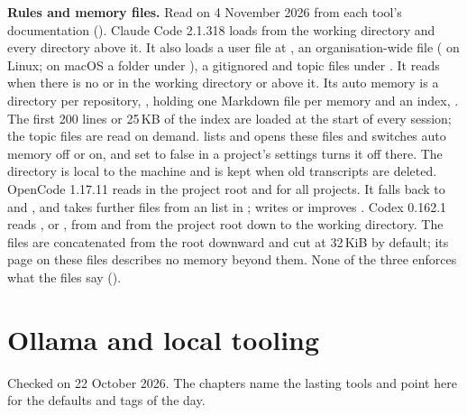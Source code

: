 \begin{sloppypar}
\textbf{Rules and memory files.} Read on 4 November 2026 from each tool's
documentation (). Claude Code 2.1.318 loads 
from the working directory and every directory above it. It also loads a user
file at , an organisation-wide file
( on Linux; on macOS a 
folder under  ), a gitignored
 and topic files under . It reads
 when there is no  or 
in the working directory or above it. Its auto memory is a directory per
repository, \allowbreak{}, holding
one Markdown file per memory and an index, . The first 200
lines or 25\,KB of the index are loaded at the start of every session; the
topic files are read on demand.  lists and opens these files and
switches auto memory off or on, and  set to false in a
project's settings turns it off there. The directory is local to the machine
and is kept when old transcripts are deleted. OpenCode 1.17.11 reads
 in the project root and
 for all projects. It falls
back to  and , and
takes further files from an  list in ;
 writes or improves . Codex 0.162.1 reads
, or , from
 and from the project root down to the working
directory. The files are concatenated from the root downward and cut at
32\,KiB by default; its page on these files describes no memory beyond them. None of the three
enforces what the files say ().
\end{sloppypar}

\section{Ollama and local tooling}

Checked on 22 October 2026. The chapters name the lasting tools and point
here for the defaults and tags of the day.


